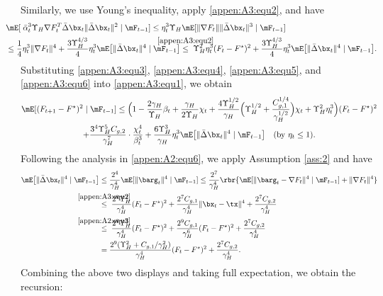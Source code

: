 \noindent Similarly, we use Young's inequality, apply \eqref{appen:A3:equ2}, and have
\begin{align}\label{appen:A3:equ6}
&\hskip-0.7cm \mE[\;\bar{\alpha}_t^3 \Upsilon_{H} \nabla F_t^{T} \bar{\Delta}\bx_t\|\bar{\Delta} \bx_t\|^2\mid \mF_{t-1}]  \leq \eta_t^3\Upsilon_{H}\mE[\|\nabla F_t\| \|\bar{\Delta}\bx_t\|^3\mid \mF_{t-1}] \nonumber\\
&\hskip-0.7cm \leq \frac{1}{4}\eta_t^3\|\nabla F_t\|^4+\frac{3\Upsilon_{H}^{4/3}}{4}\eta_t^3\mE\big[\|\bar{\Delta}\bx_t\|^4\mid\mF_{t-1}\big]  \stackrel{\mathclap{\eqref{appen:A3:equ2}}}{\leq}\; \Upsilon_{H}^2\eta_t^3(F_t-F^\star)^2+\frac{3\Upsilon_{H}^{4/3}}{4}\eta_t^3\mE\big[\|\bar{\Delta}\bx_t\|^4\mid\mF_{t-1}\big].
\end{align}
Substituting \eqref{appen:A3:equ3}, \eqref{appen:A3:equ4}, \eqref{appen:A3:equ5}, and \eqref{appen:A3:equ6} into \eqref{appen:A3:equ1}, we obtain
\begin{multline*}
\mE[(F_{t+1}-F^\star)^2\mid\mF_{t-1}]\leq \Big(1-
\frac{2\gamma_H}{\Upsilon_H}\beta_t+\frac{\gamma_H}{2\Upsilon_H}\chi_t+\frac{4\Upsilon_H^{1/2}}{\gamma_H}\Big(\Upsilon_H^{1/2}+ \frac{C_{g,1}^{1/4}}{\gamma_H^{1/2}}\Big)\chi_t+\Upsilon_{H}^2\eta_t^3\Big)(F_t-F^\star)^2\\
+\frac{3^4\Upsilon_H^5C_{g,2}}{\gamma_H^7}\cdot\frac{\chi_t^4}{\beta_t^3} +\frac{6\Upsilon_H^3}{\gamma_H} \eta_t^3\mE\big[\|\bar{\Delta} \bx_t\|^4\mid \mF_{t-1}\big]\quad(\text{by }\eta_t\leq 1).
\end{multline*}
Following the analysis in \eqref{appen:A2:equ6}, we apply Assumption \ref{ass:2} and have
\begin{align*}
\mE\big[\|\bar{\Delta} \bx_t\|^4\mid \mF_{t-1}\big] & \leq \frac{2^4}{\gamma_H^4}\mE[\|\barg_t\|^4 \mid \mF_{t-1}] \leq \frac{2^7}{\gamma_H^4}\rbr{\mE[\|\barg_t - \nabla F_t\|^4 \mid \mF_{t-1}] + \|\nabla F_t\|^4}\\
& \stackrel{\mathclap{\eqref{appen:A3:equ2}}}{\leq}\; \frac{2^9\Upsilon_{H}^2}{\gamma_H^4}(F_t-F^\star)^2 + \frac{2^7C_{g,1}}{\gamma_H^4}\|\bx_t-\tx\|^4 + \frac{2^7C_{g,2}}{\gamma_H^4}\\
& \stackrel{\mathclap{\eqref{appen:A2:equ3}}}{\leq}\; \frac{2^9\Upsilon_{H}^2}{\gamma_H^4}(F_t-F^\star)^2 + \frac{2^9C_{g,1}}{\gamma_H^6}(F_t-F^\star)^2 + \frac{2^7C_{g,2}}{\gamma_H^4} \\
& = \frac{2^{9}(\Upsilon_H^2 + C_{g,1}/\gamma_H^2)}{\gamma_H^4}(F_t-F^\star)^2 + \frac{2^7C_{g,2}}{\gamma_H^4}.
\end{align*}
Combining the above two displays and taking full expectation, we obtain the recursion:
